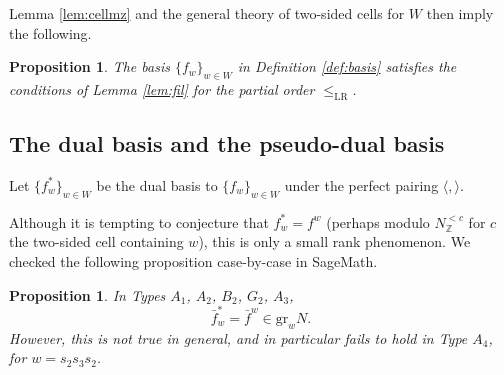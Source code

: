 \documentclass{amsart}
\newtheorem{prop}[thm]{Proposition}
\theoremstyle{definition}
\begin{document}
Lemma \ref{lem:cellmz} and the general theory of two-sided cells for $W$ then imply the following.
\begin{prop}\label{prop:conditions}
    The basis $\{f_w\}_{w \in W}$ in Definition \ref{def:basis} satisfies the conditions of Lemma \ref{lem:fil} for the partial order $\leq_{\mathrm{LR}}$.
\end{prop}

\subsection{The dual basis and the pseudo-dual basis}

Let $\{f_w^*\}_{w \in W}$ be the dual basis to $\{f_w\}_{w \in W}$ under the perfect pairing $\langle, \rangle$.

Although it is tempting to conjecture that $f_w^* = f^w$ (perhaps modulo $N^{<c}_{\mathbb{Z}}$ for $c$ the two-sided cell containing $w$), this is only a small rank phenomenon. We checked the following proposition case-by-case in SageMath.
\begin{prop}\label{prop:dualpseudo}
    In Types $A_1$, $A_2$, $B_2$, $G_2$, $A_3$,
    \begin{equation}
        \bar f_w^* = \bar f^w \in \mathrm{gr}_wN.\label{eqn:dualispseudo}
    \end{equation}
    However, this is not true in general, and in particular fails to hold in Type $A_4$, for $w = s_2s_3s_2$.
\end{prop}
\end{document}
